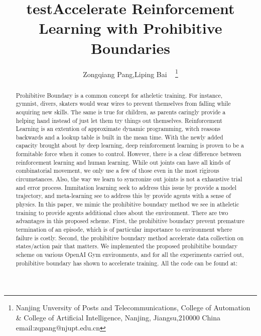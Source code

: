 \documentclass[journal]{IEEEtran}
\begin{document}
    \title{test}
\title{Accelerate Reinforcement Learning with Prohibitive Boundaries}

\author{ Zongqiang Pang,Liping Bai ~ \thanks{Nanjing Unversity of Posts and Telecommunications, College of Automation \& College of Artificial Intelligence, Nanjing, Jiangsu,210000 China email:zqpang@njupt.edu.cn}}
\maketitle
\begin{abstract}
	Prohibitive Boundary is a common concept for atheletic training. For instance, gymnist, divers, skaters would wear wires to prevent themselves from falling while acquiring new skills. The same is true for children, as parents caringly provide a helping hand instead of just let them try things out themselves. Reinforcement Learning is an extention of approximate dynamic programming, witch reasons backwards and a lookup table is built in the mean time. With the newly added capacity brought about by deep learning, deep reinforcement learning is proven to be a formitable force when it comes to control. However, there is a clear difference between reinforcement learning and human learning. While out joints can have all kinds of combinatorial movement, we only use a few of those even in the most rigirous circumstances. Also, the way we learn to syncronize out joints is not a exhaustive trial and error process. Immitation learning seek to address this issue by provide a model trajectory, and meta-learning see to address this by provide agents with a sense of physics. In this paper, we mimic the prohibitive boundary method we see in atheletic training to provide agents additional clues about the environment. There are two advantages in this proposed scheme. First, the prohibitive boundary prevent premature termination of an episode, which is of particular importance to environment where failure is costly. Second, the prohibitive boundary method accelerate data collection on states/action pair that matters. We implemented the proposed prohibitibe boundary scheme on various OpenAI Gym environments, and for all the experiments carried out, prohibitive boundary has shown to accelerate training. All the code can be found at:
\end{abstract}
\end{document}
